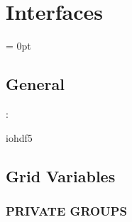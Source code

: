 
\section{Interfaces} 


\parskip = 0pt

\vspace{3mm} \subsection*{General}

: 

iohdf5
\vspace{2mm}
\subsection*{Grid Variables}
\vspace{5mm}\subsubsection{PRIVATE GROUPS}

\vspace{5mm}

